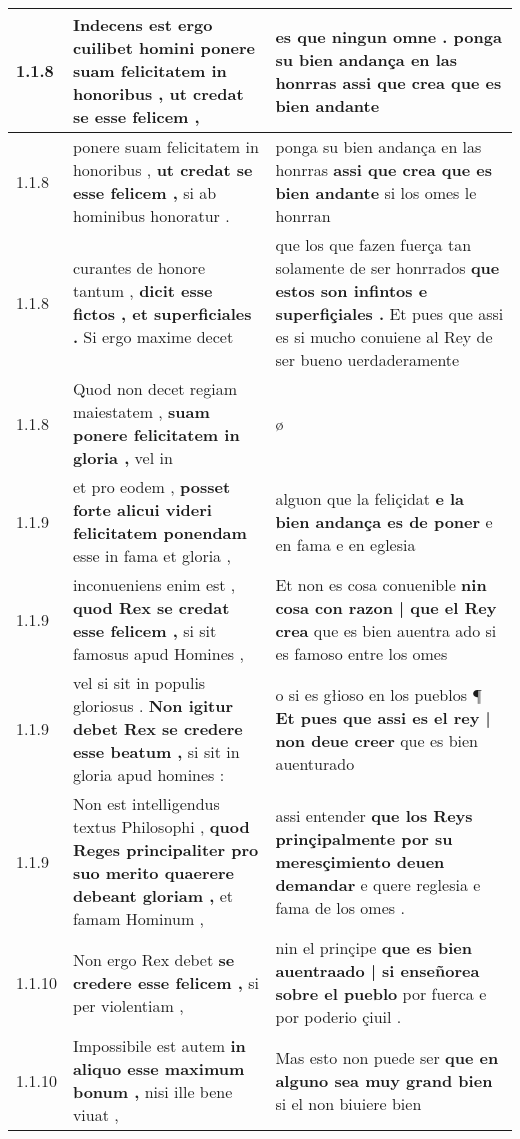 \begin{tabular}{|p{1cm}|p{6.5cm}|p{6.5cm}|}
1.1.8 & Indecens est ergo cuilibet homini \textbf{ ponere suam felicitatem in honoribus , } ut credat se esse felicem , & es que ningun omne . \textbf{ ponga su bien andança en las honrras } assi que crea que es bien andante \\\hline
1.1.8 & ponere suam felicitatem in honoribus , \textbf{ ut credat se esse felicem , } si ab hominibus honoratur . & ponga su bien andança en las honrras \textbf{ assi que crea que es bien andante } si los omes le honrran \\\hline
1.1.8 & curantes de honore tantum , \textbf{ dicit esse fictos , et superficiales . } Si ergo maxime decet & que los que fazen fuerça tan solamente de ser honrrados \textbf{ que estos son infintos e superfiçiales . } Et pues que assi es si mucho conuiene al Rey de ser bueno uerdaderamente \\\hline
1.1.8 & Quod non decet regiam maiestatem , \textbf{ suam ponere felicitatem in gloria , } vel in & ø \\\hline
1.1.9 & et pro eodem , \textbf{ posset forte alicui videri felicitatem ponendam } esse in fama et gloria , & alguon que la feliçidat \textbf{ e la bien andança es de poner } e en fama e en eglesia \\\hline
1.1.9 & inconueniens enim est , \textbf{ quod Rex se credat esse felicem , } si sit famosus apud Homines , & Et non es cosa conuenible \textbf{ nin cosa con razon | que el Rey crea } que es bien auentra ado si es famoso entre los omes \\\hline
1.1.9 & vel si sit in populis gloriosus . \textbf{ Non igitur debet Rex se credere esse beatum , } si sit in gloria apud homines : & o si es głioso en los pueblos ¶ \textbf{ Et pues que assi es el rey | non deue creer } que es bien auenturado \\\hline
1.1.9 & Non est intelligendus textus Philosophi , \textbf{ quod Reges principaliter pro suo merito quaerere debeant gloriam , } et famam Hominum , & assi entender \textbf{ que los Reys prinçipalmente por su meresçimiento deuen demandar } e quere reglesia e fama de los omes . \\\hline
1.1.10 & Non ergo Rex debet \textbf{ se credere esse felicem , } si per violentiam , & nin el prinçipe \textbf{ que es bien auentraado | si enseñorea sobre el pueblo } por fuerca e por poderio çiuil . \\\hline
1.1.10 & Impossibile est autem \textbf{ in aliquo esse maximum bonum , } nisi ille bene viuat , & Mas esto non puede ser \textbf{ que en alguno sea muy grand bien } si el non biuiere bien \\\hline

\end{tabular}
